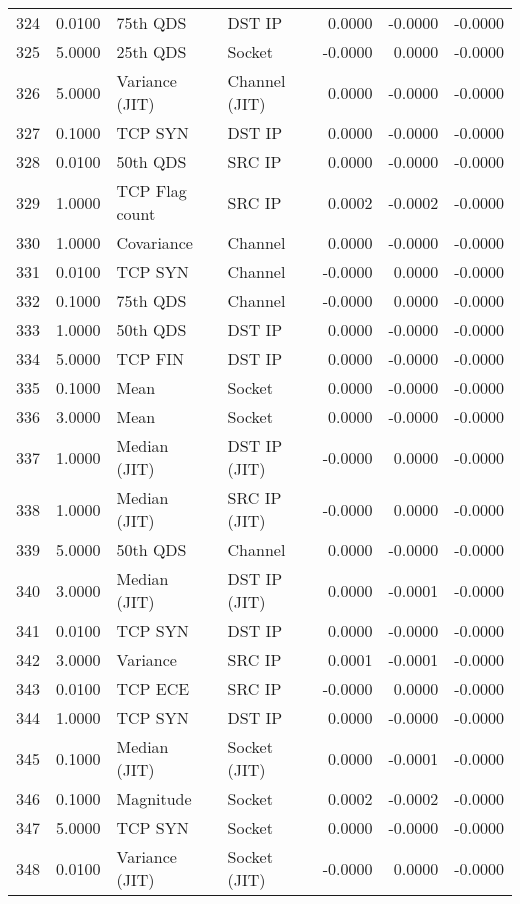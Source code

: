 \begin{longtable}{lrllrrr}
324 & 0.0100 & 75th QDS & DST IP & 0.0000 & -0.0000 & -0.0000 \\
325 & 5.0000 & 25th QDS & Socket & -0.0000 & 0.0000 & -0.0000 \\
326 & 5.0000 & Variance (JIT) & Channel (JIT) & 0.0000 & -0.0000 & -0.0000 \\
327 & 0.1000 & TCP SYN & DST IP & 0.0000 & -0.0000 & -0.0000 \\
328 & 0.0100 & 50th QDS & SRC IP & 0.0000 & -0.0000 & -0.0000 \\
329 & 1.0000 & TCP Flag count & SRC IP & 0.0002 & -0.0002 & -0.0000 \\
330 & 1.0000 & Covariance & Channel & 0.0000 & -0.0000 & -0.0000 \\
331 & 0.0100 & TCP SYN & Channel & -0.0000 & 0.0000 & -0.0000 \\
332 & 0.1000 & 75th QDS & Channel & -0.0000 & 0.0000 & -0.0000 \\
333 & 1.0000 & 50th QDS & DST IP & 0.0000 & -0.0000 & -0.0000 \\
334 & 5.0000 & TCP FIN & DST IP & 0.0000 & -0.0000 & -0.0000 \\
335 & 0.1000 & Mean & Socket & 0.0000 & -0.0000 & -0.0000 \\
336 & 3.0000 & Mean & Socket & 0.0000 & -0.0000 & -0.0000 \\
337 & 1.0000 & Median (JIT) & DST IP (JIT) & -0.0000 & 0.0000 & -0.0000 \\
338 & 1.0000 & Median (JIT) & SRC IP (JIT) & -0.0000 & 0.0000 & -0.0000 \\
339 & 5.0000 & 50th QDS & Channel & 0.0000 & -0.0000 & -0.0000 \\
340 & 3.0000 & Median (JIT) & DST IP (JIT) & 0.0000 & -0.0001 & -0.0000 \\
341 & 0.0100 & TCP SYN & DST IP & 0.0000 & -0.0000 & -0.0000 \\
342 & 3.0000 & Variance & SRC IP & 0.0001 & -0.0001 & -0.0000 \\
343 & 0.0100 & TCP ECE & SRC IP & -0.0000 & 0.0000 & -0.0000 \\
344 & 1.0000 & TCP SYN & DST IP & 0.0000 & -0.0000 & -0.0000 \\
345 & 0.1000 & Median (JIT) & Socket (JIT) & 0.0000 & -0.0001 & -0.0000 \\
346 & 0.1000 & Magnitude & Socket & 0.0002 & -0.0002 & -0.0000 \\
347 & 5.0000 & TCP SYN & Socket & 0.0000 & -0.0000 & -0.0000 \\
348 & 0.0100 & Variance (JIT) & Socket (JIT) & -0.0000 & 0.0000 & -0.0000 \\

\end{longtable}
